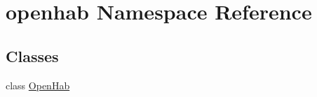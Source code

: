 \hypertarget{namespaceopenhab}{}\section{openhab Namespace Reference}
\label{namespaceopenhab}
\subsection*{Classes}
\begin{DoxyCompactItemize}
\item 
class \hyperlink{classopenhab_1_1OpenHab}{Open\+Hab}
\end{DoxyCompactItemize}
